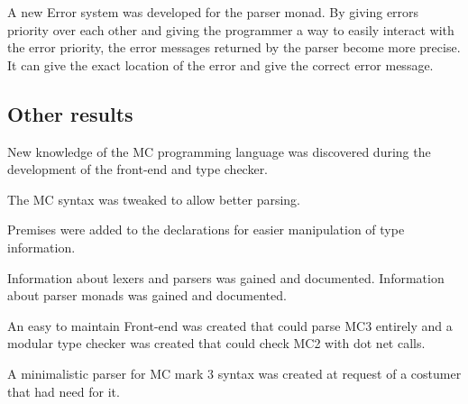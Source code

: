 A new Error system was developed for the parser monad. By giving errors priority over each other and giving the programmer a way to easily interact with the error priority, the error messages returned by the parser become more precise. It can give the exact location of the error and give the correct error message. 

\subsection{Other results}
New knowledge of the MC programming language was discovered during the development of the front-end and type checker. 

The MC syntax was tweaked to allow better parsing.

Premises were added to the declarations for easier manipulation of type information.

Information about lexers and parsers was gained and documented.
Information about parser monads was gained and documented.

An easy to maintain Front-end was created that could parse MC3 entirely and a modular type checker was created that could check MC2 with dot net calls.

A minimalistic parser for MC mark 3 syntax was created at request of a costumer that had need for it.  
